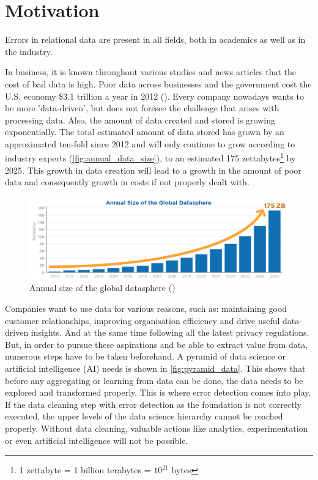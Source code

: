 \section{Motivation}
\label{sec:motivation}
Errors in relational data are present in all fields, both in academics as well as in the industry. 

In business, it is known throughout various studies and news articles that the cost of bad data is high. Poor data across businesses and the government cost the U.S. economy \$3.1 trillion a year in 2012 (\cite{Ilyas2015-oh}). Every company nowadays wants to be more 'data-driven', but does not foresee the challenge that arises with processing data. Also, the amount of data created and stored is growing exponentially. The total estimated amount of data stored has grown by an approximated ten-fold since 2012 and will only continue to grow according to industry experts (\autoref{fig:annual_data_size}), to an estimated 175 zettabytes\footnote{1 zettabyte = 1 billion terabytes = $10^{21}$ bytes} by 2025. This growth in data creation will lead to a growth in the amount of poor data and consequently growth in costs if not properly dealt with. 

\begin{figure}
    \centering
    \includegraphics[width=\textwidth]{thesis/Figures/AnnualDataSize.png}
    \caption{Annual size of the global datasphere (\cite{Rydning2018-mt})}
    \label{fig:annual_data_size}
\end{figure}

Companies want to use data for various reasons, such as: maintaining good customer relationships, improving organisation efficiency and drive useful data-driven insights. And at the same time following all the latest privacy regulations.  
But, in order to pursue these aspirations and be able to extract value from data, numerous steps have to be taken beforehand. A pyramid of data science or artificial intelligence (AI) needs is shown in \autoref{fig:pyramid_data}. This shows that before any aggregating or learning from data can be done, the data needs to be explored and transformed properly. This is where error detection comes into play. If the data cleaning step with error detection as the foundation is not correctly executed, the upper levels of the data science hierarchy cannot be reached properly. Without data cleaning, valuable actions like analytics, experimentation or even artificial intelligence will not be possible.

